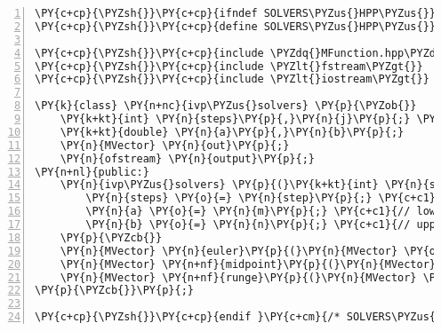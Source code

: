 \begin{Verbatim}[commandchars=\\\{\},numbers=left,firstnumber=1,stepnumber=1]
\PY{c+cp}{\PYZsh{}}\PY{c+cp}{ifndef SOLVERS\PYZus{}HPP\PYZus{}}
\PY{c+cp}{\PYZsh{}}\PY{c+cp}{define SOLVERS\PYZus{}HPP\PYZus{}}

\PY{c+cp}{\PYZsh{}}\PY{c+cp}{include \PYZdq{}MFunction.hpp\PYZdq{}}
\PY{c+cp}{\PYZsh{}}\PY{c+cp}{include \PYZlt{}fstream\PYZgt{}}
\PY{c+cp}{\PYZsh{}}\PY{c+cp}{include \PYZlt{}iostream\PYZgt{}}

\PY{k}{class} \PY{n+nc}{ivp\PYZus{}solvers} \PY{p}{\PYZob{}}
	\PY{k+kt}{int} \PY{n}{steps}\PY{p}{,}\PY{n}{j}\PY{p}{;} \PY{c+c1}{// variables all functions in the class need}
	\PY{k+kt}{double} \PY{n}{a}\PY{p}{,}\PY{n}{b}\PY{p}{;}
	\PY{n}{MVector} \PY{n}{out}\PY{p}{;}
	\PY{n}{ofstream} \PY{n}{output}\PY{p}{;}
\PY{n+nl}{public:}
	\PY{n}{ivp\PYZus{}solvers} \PY{p}{(}\PY{k+kt}{int} \PY{n}{step}\PY{p}{,} \PY{k+kt}{double} \PY{n}{m}\PY{p}{,} \PY{k+kt}{double} \PY{n}{n}\PY{p}{)}\PY{p}{\PYZob{}}
		\PY{n}{steps} \PY{o}{=} \PY{n}{step}\PY{p}{;} \PY{c+c1}{// number of steps}
		\PY{n}{a} \PY{o}{=} \PY{n}{m}\PY{p}{;} \PY{c+c1}{// lower end of interval}
		\PY{n}{b} \PY{o}{=} \PY{n}{n}\PY{p}{;} \PY{c+c1}{// upper end of interval}
	\PY{p}{\PYZcb{}}
	\PY{n}{MVector} \PY{n}{euler}\PY{p}{(}\PY{n}{MVector} \PY{o}{\PYZam{}}\PY{n}{y}\PY{p}{,} \PY{n}{MFunction} \PY{o}{\PYZam{}}\PY{n}{f}\PY{p}{,} \PY{k+kt}{int} \PY{n}{j}\PY{p}{)}\PY{p}{;}
	\PY{n}{MVector} \PY{n+nf}{midpoint}\PY{p}{(}\PY{n}{MVector} \PY{o}{\PYZam{}}\PY{n}{y}\PY{p}{,} \PY{n}{MFunction} \PY{o}{\PYZam{}}\PY{n}{f}\PY{p}{,} \PY{k+kt}{int} \PY{n}{j}\PY{p}{)}\PY{p}{;}
	\PY{n}{MVector} \PY{n+nf}{runge}\PY{p}{(}\PY{n}{MVector} \PY{o}{\PYZam{}}\PY{n}{y}\PY{p}{,} \PY{n}{MFunction} \PY{o}{\PYZam{}}\PY{n}{f}\PY{p}{,} \PY{k+kt}{int} \PY{n}{j}\PY{p}{)}\PY{p}{;}
\PY{p}{\PYZcb{}}\PY{p}{;}

\PY{c+cp}{\PYZsh{}}\PY{c+cp}{endif }\PY{c+cm}{/* SOLVERS\PYZus{}HPP\PYZus{} */}
\end{Verbatim}
